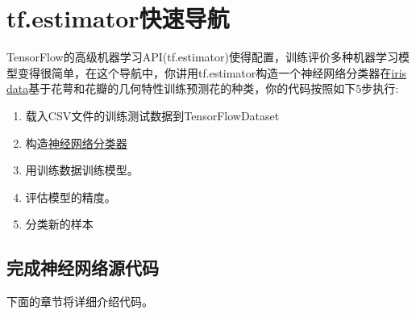 \section{tf.estimator快速导航}
TensorFlow的高级机器学习API(tf.estimator)使得配置，训练评价多种机器学习模型变得很简单，在这个导航中，你讲用tf.estimator构造一个神经网络分类器在\href{https://en.wikipedia.org/wiki/Iris_flower_data_set}{iris data}基于花萼和花瓣的几何特性训练预测花的种类，你的代码按照如下5步执行:
\begin{enumerate}
    \item 载入CSV文件的训练测试数据到TensorFlowDataset
    \item 构造\href{https://www.tensorflow.org/api_docs/python/tf/estimator/DNNClassifier}{神经网络分类器}
    \item 用训练数据训练模型。
    \item 评估模型的精度。
    \item 分类新的样本
\end{enumerate}
\subsection{完成神经网络源代码}

下面的章节将详细介绍代码。
